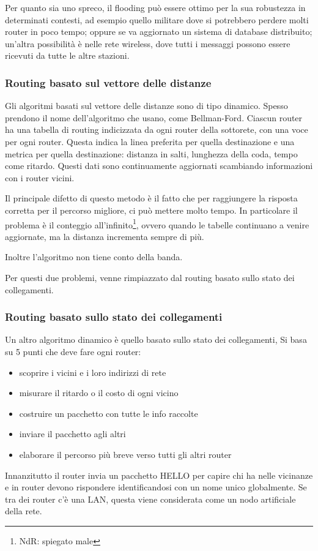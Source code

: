 Per quanto sia uno spreco, il flooding può essere ottimo per la sua robustezza in determinati contesti, ad esempio quello militare dove si potrebbero perdere molti router in poco tempo;
oppure se va aggiornato un sistema di database distribuito;
un'altra possibilità è nelle rete wireless, dove tutti i messaggi possono essere ricevuti da tutte le altre stazioni.

\subsubsection{Routing basato sul vettore delle distanze}
Gli algoritmi basati sul vettore delle distanze sono di tipo dinamico.
Spesso prendono il nome dell'algoritmo che usano, come Bellman-Ford.
Ciascun router ha una tabella di routing indicizzata da ogni router della sottorete, con una voce per ogni router.
Questa indica la linea preferita per quella destinazione e una metrica per quella destinazione: distanza in salti, lunghezza della coda, tempo come ritardo.
Questi dati sono continuamente aggiornati scambiando informazioni con i router vicini.

Il principale difetto di questo metodo è il fatto che per raggiungere la risposta corretta per il percorso migliore, ci può mettere molto tempo.
In particolare il problema è il conteggio all'infinito\footnote{NdR: spiegato male}, ovvero quando le tabelle continuano a venire aggiornate, ma la distanza incrementa sempre di più.

Inoltre l'algoritmo non tiene conto della banda.

Per questi due problemi, venne rimpiazzato dal routing basato sullo stato dei collegamenti.

\subsubsection{Routing basato sullo stato dei collegamenti} %
Un altro algoritmo dinamico è quello basato sullo stato dei collegamenti,
Si basa su 5 punti che deve fare ogni router:
\begin{itemize}
\item scoprire i vicini e i loro indirizzi di rete
\item misurare il ritardo o il costo di ogni vicino
\item costruire un pacchetto con tutte le info raccolte
\item inviare il pacchetto agli altri
\item elaborare il percorso più breve verso tutti gli altri router
\end{itemize}
Innanzitutto il router invia un pacchetto HELLO per capire chi ha nelle vicinanze e in router devono rispondere identificandosi con un nome unico globalmente.
Se tra dei router c'è una LAN, questa viene considerata come un nodo artificiale della rete.

